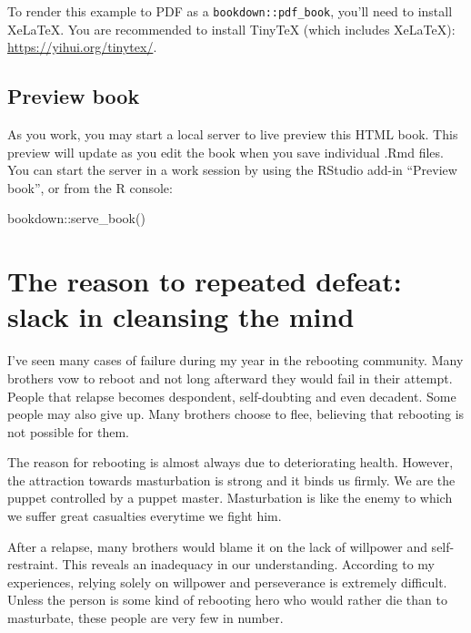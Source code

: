 \documentclass[
]{book}
\newenvironment{Shaded}{\begin{snugshade}}{\end{snugshade}}
\newcommand{\FunctionTok}[1]{\textcolor[rgb]{0.00,0.00,0.00}{#1}}
\newcommand{\NormalTok}[1]{#1}
\newcommand{\SpecialCharTok}[1]{\textcolor[rgb]{0.00,0.00,0.00}{#1}}
\begin{document}
To render this example to PDF as a \texttt{bookdown::pdf\_book}, you'll need to install XeLaTeX. You are recommended to install TinyTeX (which includes XeLaTeX): \url{https://yihui.org/tinytex/}.

\hypertarget{preview-book}{%
\section{Preview book}\label{preview-book}}

As you work, you may start a local server to live preview this HTML book. This preview will update as you edit the book when you save individual .Rmd files. You can start the server in a work session by using the RStudio add-in ``Preview book'', or from the R console:

\begin{Shaded}
\begin{Highlighting}[]
\NormalTok{bookdown}\SpecialCharTok{::}\FunctionTok{serve\_book}\NormalTok{()}
\end{Highlighting}
\end{Shaded}

\hypertarget{the-reason-to-repeated-defeat-slack-in-cleansing-the-mind}{%
\chapter{The reason to repeated defeat: slack in cleansing the mind}\label{the-reason-to-repeated-defeat-slack-in-cleansing-the-mind}}

I've seen many cases of failure during my year in the rebooting community. Many brothers vow to reboot and not long afterward they would fail in their attempt. People that relapse becomes despondent, self-doubting and even decadent. Some people may also give up. Many brothers choose to flee, believing that rebooting is not possible for them.

The reason for rebooting is almost always due to deteriorating health. However, the attraction towards masturbation is strong and it binds us firmly. We are the puppet controlled by a puppet master. Masturbation is like the enemy to which we suffer great casualties everytime we fight him.

After a relapse, many brothers would blame it on the lack of willpower and self-restraint. This reveals an inadequacy in our understanding. According to my experiences, relying solely on willpower and perseverance is extremely difficult. Unless the person is some kind of rebooting hero who would rather die than to masturbate, these people are very few in number.
\end{document}

